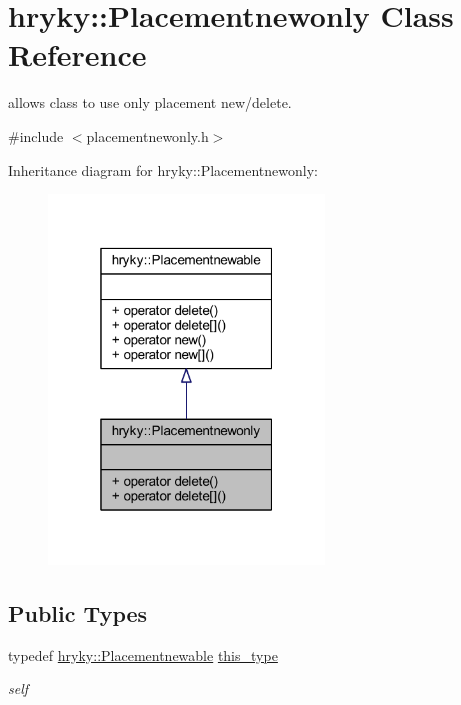 \hypertarget{classhryky_1_1_placementnewonly}{\section{hryky\-:\-:Placementnewonly Class Reference}
\label{classhryky_1_1_placementnewonly}
}


allows class to use only placement new/delete.  




{\ttfamily \#include $<$placementnewonly.\-h$>$}



Inheritance diagram for hryky\-:\-:Placementnewonly\-:\nopagebreak
\begin{figure}[H]
\begin{center}
\leavevmode
\includegraphics[width=208pt]{classhryky_1_1_placementnewonly__inherit__graph}
\end{center}
\end{figure}
\subsection*{Public Types}
\begin{DoxyCompactItemize}
\item 
\hypertarget{classhryky_1_1_placementnewable_a3ace62969c7f685d944479a32ba7c6aa}{typedef \hyperlink{classhryky_1_1_placementnewable}{hryky\-::\-Placementnewable} \hyperlink{classhryky_1_1_placementnewable_a3ace62969c7f685d944479a32ba7c6aa}{this\-\_\-type}}\label{classhryky_1_1_placementnewable_a3ace62969c7f685d944479a32ba7c6aa}

\begin{DoxyCompactList}\small\item\em self \end{DoxyCompactList}\end{DoxyCompactItemize}
